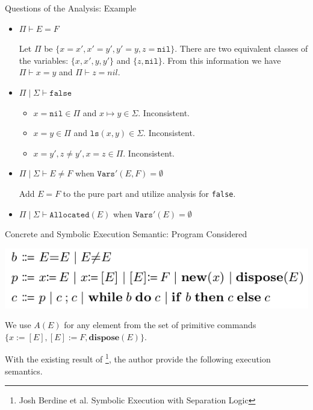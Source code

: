 \documentclass[aspectratio=1610, 13pt]{beamer}
\begin{document}
\begin{frame}{Questions of the Analysis: Example}
\begin{example}
    \begin{itemize}
        \item $\Pi\vdash E = F$
        
        Let $\Pi$ be $\{x = x', x' = y', y' = y, z = \texttt{nil}\}$. There are two equivalent classes of the variables: $\{x, x', y, y'\}$ and $\{z, \texttt{nil}\}$. From this information we have $\Pi\vdash x = y$ and $\Pi\vdash z = nil$.
        
        
        
        \item $\Pi\mid \Sigma \vdash \texttt{false}$
        \begin{itemize}
            \item $x = \texttt{nil}\in \Pi$ and $x\mapsto y\in \Sigma$. Inconsistent.
            \item $x = y \in \Pi $ and $\texttt{ls}(x,y)\in \Sigma$. Inconsistent.
            \item $x = y', z\ne y', x = z\in \Pi$. Inconsistent.
        \end{itemize}
        \item $\Pi\mid \Sigma \vdash E\ne F $ when $\texttt{Vars}'(E, F)=\emptyset$
        
        Add $E = F$ to the pure part and utilize analysis for \texttt{false}.
        
        \item $\Pi\mid \Sigma \vdash \texttt{Allocated}(E)$ when $ \texttt{Vars}'(E)=\emptyset$
    \end{itemize}
\end{example}
    
\end{frame}

\begin{frame}{Concrete and Symbolic Execution Semantic: Program Considered}
    \begin{center}
        \includegraphics[scale=0.45]{program.png}
    \end{center}
    We use $A(E)$ for any element from the set of primitive commands $\{x:=[E], [E]:=F, \mathbf{dispose}(E)\}$.
    
    With the existing result of \footnote{Josh Berdine et al. Symbolic Execution with Separation Logic}, the author provide the following execution semantics.
\end{frame}
\end{document}

